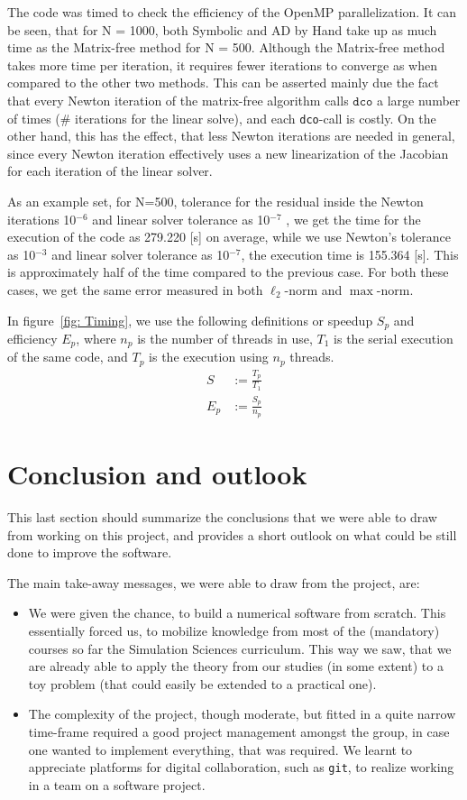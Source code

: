 \documentclass[11pt]{scrartcl}
\begin{document}
The code was timed to check the efficiency of the OpenMP parallelization. It can be seen, that for N = 1000, both Symbolic and AD by Hand take up as much time as the Matrix-free method for N = 500. Although the Matrix-free method takes more time per iteration, it requires fewer iterations to converge as when compared to the other two methods.
This can be asserted mainly due the fact that every Newton iteration of the matrix-free algorithm calls $\texttt{dco}$ a large number of times (\# iterations for the linear solve), and each \texttt{dco}-call is costly. On the other hand, this has the effect, that less Newton iterations are needed in general, since every Newton iteration effectively uses a new linearization of the Jacobian for each iteration of the linear solver.

As an example set, for N=500, tolerance for the residual inside the Newton iterations 10$^{-6}$ and linear solver tolerance as 10$^{-7}$ , we get the time for the execution of the code as 279.220 [s] on average, while we use Newton's tolerance as 10$^{-3}$ and linear solver tolerance as 10$^{-7}$, the execution time is 155.364 [s]. This is approximately half of the time compared to the previous case. For both these cases, we get the same error measured in both $\ell_2$-norm and $\max$-norm.

In figure~\ref{fig: Timing}, we use the following definitions or speedup $S_p$ and efficiency $E_p$, where $n_p$ is the number of threads in use, $T_1$ is the serial execution of the same code, and $T_p$ is the execution using $n_p$ threads.
\begin{align}
	S &:= \frac{T_p}{T_1} \\
	E_p &:= \frac{S_p}{n_p}
\end{align}

\newpage
\section{Conclusion and outlook}
This last section should summarize the conclusions that we were able to draw from working on this project, and provides a short outlook on what could be still done to improve the software.

The main take-away messages, we were able to draw from the project, are:
\begin{itemize}
	\item We were given the chance, to build a numerical software from scratch. This essentially forced us, to mobilize knowledge from most of the (mandatory) courses so far the Simulation Sciences curriculum. This way we saw, that we are already able to apply the theory from our studies (in some extent) to a toy problem (that could easily be extended to a practical one).
	\item The complexity of the project, though moderate, but fitted in a quite narrow time-frame required a good project management amongst the group, in case one wanted to implement everything, that was required. We learnt to appreciate platforms for digital collaboration, such as \texttt{git}, to realize working in a team on a software project.
\end{itemize}
\end{document}
